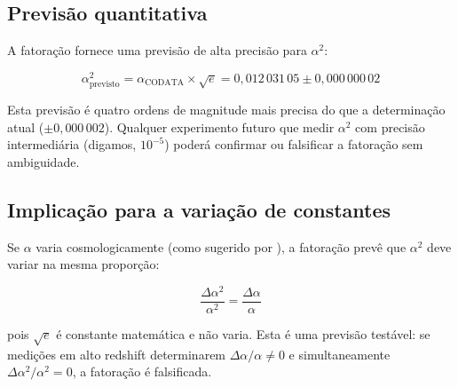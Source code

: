 \documentclass[12pt,a4paper,twoside]{article}
\newcommand{\alphaii}{\alpha^{2}}
\begin{document}
\subsection{Previsão quantitativa}

A fatoração fornece uma previsão de alta precisão para $\alphaii$:

\begin{equation}
\alphaii_{\text{previsto}} = \alpha_{\text{CODATA}} \times \sqrt{e} = 0{,}012\,031\,05 \pm 0{,}000\,000\,02
\end{equation}

Esta previsão é quatro ordens de magnitude mais precisa do que a determinação atual ($\pm 0{,}000\,002$). Qualquer experimento futuro que medir $\alphaii$ com precisão intermediária (digamos, $10^{-5}$) poderá confirmar ou falsificar a fatoração sem ambiguidade.

\subsection{Implicação para a variação de constantes}

Se $\alpha$ varia cosmologicamente (como sugerido por \cite{Webb2001}), a fatoração prevê que $\alphaii$ deve variar na mesma proporção:

\begin{equation}
\frac{\Delta\alphaii}{\alphaii} = \frac{\Delta\alpha}{\alpha}
\label{eq:variacao}
\end{equation}

\noindent pois $\sqrt{e}$ é constante matemática e não varia. Esta é uma previsão testável: se medições em alto redshift determinarem $\Delta\alpha/\alpha \neq 0$ e simultaneamente $\Delta\alphaii/\alphaii = 0$, a fatoração é falsificada.

%
%
%
%
%
%
%
\end{document}
